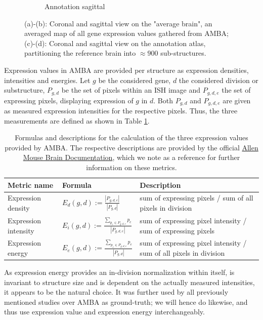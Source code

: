 \documentclass[]{article}
\begin{document}
\begin{figure}
\begin{subfigure}{.3\textwidth}
		\caption{Annotation sagittal}
		\label{fig:ano_sag}
	\end{subfigure}
	\caption{(a)-(b): Coronal and sagittal view on the "average brain", an averaged map of all gene expression values gathered from AMBA; (c)-(d): Coronal and sagittal view on the annotation atlas, partitioning the reference brain into $\approx900$ sub-structures.}
	\label{fig:CCF_images}
\end{figure}

Expression values in AMBA are provided per structure as expression densities, intensities and energies. Let $g$ be the considered gene, $d$ the considered division or substructure, $P_{g,d}$ be the set of pixels within an ISH image and $P_{g,d,e}$ the set of expressing pixels, displaying expression of $g$ in $d$. Both $P_{g,d}$ and $P_{g,d,e}$ are given as measured expression intensities for the respective pixels. Thus, the three measurements are defined as shown in Table \ref{tab:expr_values}.

\begin{table}
	\renewcommand{\arraystretch}{3}
	\begin{tabular}{llp{8cm}}
		Metric name&Formula&Description\\
		\hline
		Expression density&$E_d(g,d):=\frac{|P_{g,d,e}|}{|P_{g,d}|}$&sum of expressing pixels / sum of all pixels in division\\
		Expression intensity&$E_i(g,d):=\frac{\sum_{p_e\in P_{g,d,e}} p_e}{|P_{g,d,e}|}$&sum of expressing pixel intensity / sum of expressing pixels\\
		Expression energy&$E_e(g,d):=\frac{\sum_{p_e\in P_{g,d,e}} p_e}{|P_{g,d}|}$&sum of expressing pixel intensity / sum of all pixels in division\\
	\end{tabular}
	\label{tab:expr_values}
	\caption{Formulas and descriptions for the calculation of the three expression values provided by AMBA. The respective descriptions are provided by the official \href{http://help.brain-map.org/download/attachments/2818169/InformaticsDataProcessing.pdf?version=1&modificationDate=1319667590884&api=v2}{Allen Mouse Brain Documentation}, which we note as a reference for further information on these metrics.}
\end{table}

 As expression energy provides an in-division normalization within itself, is invariant to structure size and is dependent on the actually measured intensities, it appears to be the natural choice. It was further used by all previously mentioned studies over AMBA as ground-truth; we will hence do likewise, and thus use expression value and expression energy interchangeably.
\end{document}
